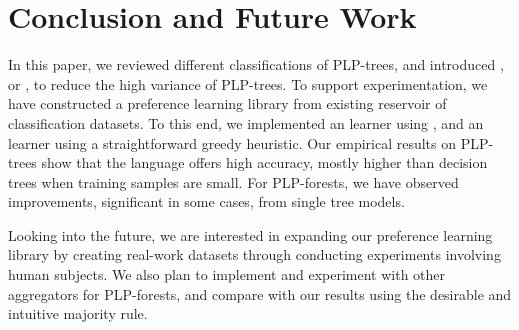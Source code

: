 \section{Conclusion and Future Work}
In this paper, we reviewed different classifications of PLP-trees,
and introduced ,
or , to reduce the high variance of PLP-trees.
To support experimentation, we have constructed a preference
learning library from existing reservoir of classification
datasets.
To this end, we implemented an  learner using
, and an 
learner using a straightforward greedy heuristic.
Our empirical results on PLP-trees show that the language offers
high accuracy, mostly higher than decision trees when training samples
are small.
For PLP-forests, we have observed improvements, significant in some cases,
from single tree models.

Looking into the future, we are interested in expanding our preference
learning library by creating real-work datasets through
conducting experiments involving human subjects.
We also plan to implement and experiment with other aggregators
for PLP-forests, and compare with our results using
the desirable and intuitive majority rule.
